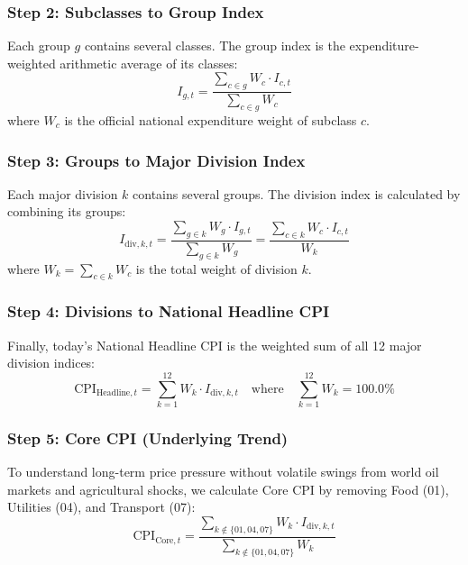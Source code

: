 \documentclass[11pt,a4paper,oneside]{article}
\begin{document}
\subsubsection{Step 2: Subclasses to Group Index}
Each group $g$ contains several classes. The group index is the expenditure-weighted arithmetic average of its classes:
\begin{equation}
I_{g, t} = \frac{\sum_{c \in g} W_c \cdot I_{c, t}}{\sum_{c \in g} W_c}
\end{equation}
where $W_c$ is the official national expenditure weight of subclass $c$.

\subsubsection{Step 3: Groups to Major Division Index}
Each major division $k$ contains several groups. The division index is calculated by combining its groups:
\begin{equation}
I_{\text{div}, k, t} = \frac{\sum_{g \in k} W_g \cdot I_{g, t}}{\sum_{g \in k} W_g} = \frac{\sum_{c \in k} W_c \cdot I_{c, t}}{W_k}
\end{equation}
where $W_k = \sum_{c \in k} W_c$ is the total weight of division $k$.

\subsubsection{Step 4: Divisions to National Headline CPI}
Finally, today's National Headline CPI is the weighted sum of all 12 major division indices:
\begin{equation}
\text{CPI}_{\text{Headline}, t} = \sum_{k=1}^{12} W_k \cdot I_{\text{div}, k, t} \quad \text{where} \quad \sum_{k=1}^{12} W_k = 100.0\%
\end{equation}

\subsubsection{Step 5: Core CPI (Underlying Trend)}
To understand long-term price pressure without volatile swings from world oil markets and agricultural shocks, we calculate Core CPI by removing Food (01), Utilities (04), and Transport (07):
\begin{equation}
\text{CPI}_{\text{Core}, t} = \frac{\sum_{k \notin \{01, 04, 07\}} W_k \cdot I_{\text{div}, k, t}}{\sum_{k \notin \{01, 04, 07\}} W_k}
\end{equation}

\newpage
\end{document}

